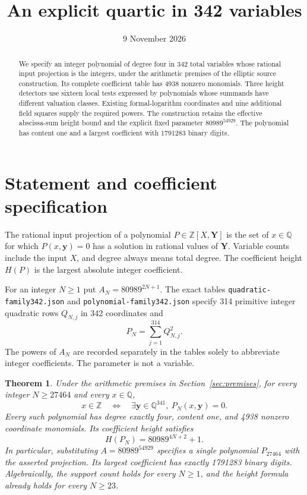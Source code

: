 \documentclass[11pt,a4paper]{article}
\title{An explicit quartic in 342 variables}
\author{}\date{9 November 2026}
\newtheorem{theorem}{Theorem}[section]
\theoremstyle{remark}\newtheorem{remark}[theorem]{Remark}
\newcommand{\Q}{\mathbb Q}\newcommand{\Z}{\mathbb Z}\newcommand{\HH}{\mathcal H}
\begin{document}
\maketitle
\begin{abstract}
We specify an integer polynomial of degree four in 342 total variables
whose rational input projection is the integers, under the arithmetic
premises of the elliptic source construction. Its complete coefficient
table has 4938 nonzero monomials. Three height detectors use sixteen
local tests expressed by polynomials whose summands have different
valuation classes. Existing formal-logarithm coordinates and nine
additional field squares supply the required powers. The construction retains
the effective abscissa-sum height bound and the explicit fixed parameter
$80989^{54929}$. The polynomial has content one and a largest coefficient
with 1791283 binary digits.
\end{abstract}

\section{Statement and coefficient specification}
The rational input projection of a polynomial $P\in\Z[X,\boldsymbol Y]$
is the set of $x\in\Q$ for which $P(x,\boldsymbol y)=0$ has a solution
in rational values of $\boldsymbol Y$. Variable counts include the input
$X$, and degree always means total degree. The coefficient height $H(P)$
is the largest absolute integer coefficient.

For an integer $N\ge1$ put $A_N=80989^{2N+1}$. The exact tables
\nolinkurl{quadratic-family342.json} and
\nolinkurl{polynomial-family342.json} specify 314 primitive integer
quadratic rows $Q_{N,j}$ in 342 coordinates and
\[
                    P_N=\sum_{j=1}^{314}Q_{N,j}^2.
\]
The powers of $A_N$ are recorded separately in the tables solely to
abbreviate integer coefficients. The parameter is not a variable.

\begin{theorem}\label{thm:main}
Under the arithmetic premises in Section~\ref{sec:premises}, for every
integer $N\ge27464$ and every $x\in\Q$,
\[
 x\in\Z\quad\Longleftrightarrow\quad
 \exists\boldsymbol y\in\Q^{341},\ P_N(x,\boldsymbol y)=0.
\]
Every such polynomial has degree exactly four, content one, and 4938
nonzero coordinate monomials. Its coefficient height satisfies
\[
                         H(P_N)=80989^{4N+2}+1.
\]
In particular, substituting $A=80989^{54929}$ specifies a single
polynomial $P_{27464}$ with the asserted projection. Its largest
coefficient has exactly 1791283 binary digits. Algebraically, the support
count holds for every $N\ge1$, and the height formula already holds
for every $N\ge23$.
\end{theorem}
\end{document}
